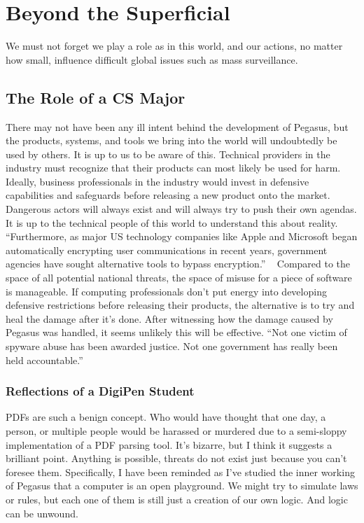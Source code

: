 \documentclass[sigconf]{acmart}
\begin{document}
\section{Beyond the Superficial}
We must not forget we play a role as in this world, and our actions, no matter how small, influence difficult global issues such as mass surveillance.
\subsection{The Role of a CS Major}
There may not have been any ill intent behind the development of Pegasus, but the products, systems, and tools we bring into the world will undoubtedly be used by others. It is up to us to be aware of this. Technical providers in the industry must recognize that their products can most likely be used for harm. Ideally, business professionals in the industry would invest in defensive capabilities and safeguards before releasing a new product onto the market. Dangerous actors will always exist and will always try to push their own agendas. It is up to the technical people of this world to understand this about reality. “Furthermore, as major US technology companies like Apple and Microsoft began automatically encrypting user communications in recent years, government agencies have sought alternative tools to bypass encryption.” ~\cite{used_thirteenth(14)} Compared to the space of all potential national threats, the space of misuse for a piece of software is manageable. If computing professionals don’t put energy into developing defensive restrictions before releasing their products, the alternative is to try and heal the damage after it’s done. After witnessing how the damage caused by Pegasus was handled, it seems unlikely this will be effective. “Not one victim of spyware abuse has been awarded justice. Not one government has really been held accountable.” ~\cite{used_fourteenth(15)}
\subsubsection{Reflections of a DigiPen Student}
PDFs are such a benign concept. Who would have thought that one day, a person, or multiple people would be harassed or murdered due to a semi-sloppy implementation of a PDF parsing tool. It's bizarre, but I think it suggests a brilliant point. Anything is possible, threats do not exist just because you can't foresee them. Specifically, I have been reminded as I've studied the inner working of Pegasus that a computer is an open playground. We might try to simulate laws or rules, but each one of them is still just a creation of our own logic. And logic can be unwound.
{}

\end{document}
